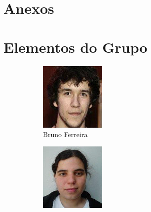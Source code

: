 \documentclass[11pt, a4paper, oneside]{article}
\begin{document}
\newpage

\section{Anexos}

\newpage

\section{Elementos do Grupo}
\begin{figure}[h!]
\centering
\begin{subfigure}{.33\textwidth}
  \centering
  \includegraphics[width=0.8\linewidth]{60}
  \caption{Bruno Ferreira  }
\end{subfigure}%
\begin{subfigure}{.33\textwidth}
  \centering
  \includegraphics[width=0.8\linewidth]{107}

\end{subfigure}
\end{figure}
\end{document}
